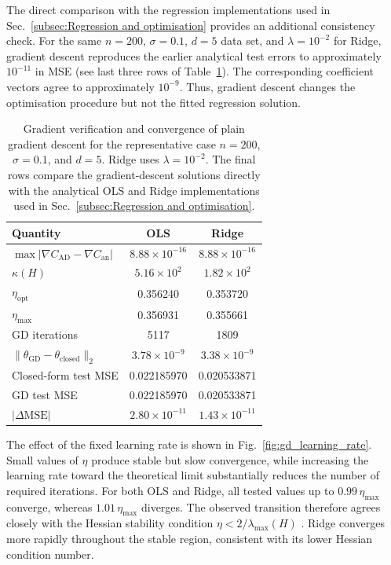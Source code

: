 \documentclass[aps,rmp,reprint,amsmath,amssymb,graphicx,longbibliography]{revtex4-1}
\begin{document}
The direct comparison with the regression implementations used in Sec.~\ref{subsec:Regression and optimisation} provides an additional consistency check. For the same $n=200$, $\sigma=0.1$, $d=5$ data set, and $\lambda=10^{-2}$ for Ridge, gradient descent reproduces the earlier analytical test errors to approximately
$10^{-11}$ in MSE (see last three rows of Table~\ref{tab:gd_results}). The corresponding coefficient vectors agree to approximately $10^{-9}$. Thus, gradient descent changes the optimisation procedure but not the fitted regression solution.

\begin{table}[t]
    \centering
    \caption{Gradient verification and convergence of plain gradient descent for
the representative case $n=200$, $\sigma=0.1$, and $d=5$. Ridge uses
$\lambda=10^{-2}$. The final rows compare the gradient-descent solutions
directly with the analytical OLS and Ridge implementations used in Sec.~\ref{subsec:Regression and optimisation}.}
    \label{tab:gd_results}
    \begin{tabular}{lcc}
        \hline
        Quantity & OLS & Ridge \\
        \hline
        $\max|\nabla C_{\mathrm{AD}}-\nabla C_{\mathrm{an}}|$
            & $8.88\times10^{-16}$ & $8.88\times10^{-16}$ \\
        $\kappa(H)$
            & $5.16\times10^{2}$ & $1.82\times10^{2}$ \\
        $\eta_{\mathrm{opt}}$
            & 0.356240 & 0.353720 \\
        $\eta_{\max}$
            & 0.356931 & 0.355661 \\
        GD iterations
            & 5117 & 1809 \\
        $\|\theta_{\mathrm{GD}}-\theta_{\mathrm{closed}}\|_2$
            & $3.78\times10^{-9}$ & $3.38\times10^{-9}$ \\
        Closed-form test MSE
            & 0.022185970 & 0.020533871 \\
        GD test MSE
            & 0.022185970 & 0.020533871 \\
        $|\Delta\mathrm{MSE}|$
            &  $2.80\times10^{-11}$
            & $1.43\times10^{-11}$ \\
        \hline
    \end{tabular}
\end{table}

The effect of the fixed learning rate is shown in
Fig.~\ref{fig:gd_learning_rate}. Small values of $\eta$ produce stable but slow
convergence, while increasing the learning rate toward the theoretical limit
substantially reduces the number of required iterations. For both OLS and
Ridge, all tested values up to $0.99\,\eta_{\max}$ converge, whereas
$1.01\,\eta_{\max}$ diverges. The observed transition therefore agrees closely
with the Hessian stability condition $\eta<2/\lambda_{\max}(H)$
\cite{HjorthJensen2026MLPSCh4}. Ridge converges more rapidly throughout the
stable region, consistent with its lower Hessian condition number.
\end{document}

